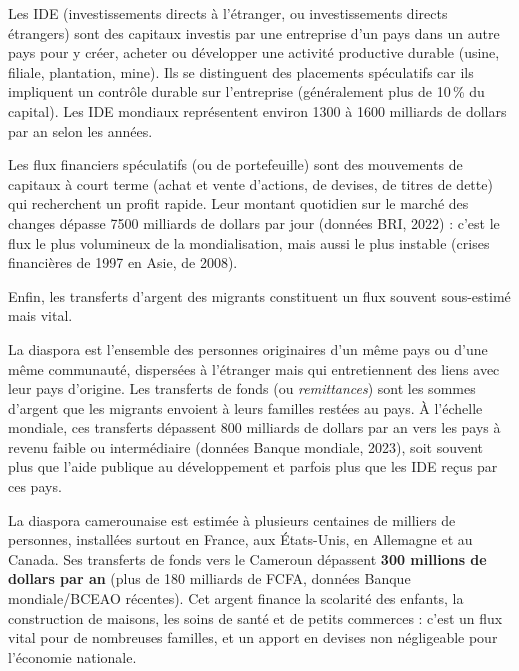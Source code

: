 \documentclass[11pt]{article}
\newcommand{\cle}[1]{{\popxbold\color{popdark}#1}}
\begin{document}
\begin{definition}
Les \cle{IDE} (investissements directs à l'étranger, ou investissements directs étrangers) sont des capitaux investis par une entreprise d'un pays dans un autre pays pour y créer, acheter ou développer une activité productive durable (usine, filiale, plantation, mine). Ils se distinguent des placements spéculatifs car ils impliquent un contrôle durable sur l'entreprise (généralement plus de 10\,\% du capital). Les IDE mondiaux représentent environ \num{1300} à \num{1600} milliards de dollars par an selon les années.
\end{definition}

Les \cle{flux financiers spéculatifs} (ou de portefeuille) sont des mouvements de capitaux à court terme (achat et vente d'actions, de devises, de titres de dette) qui recherchent un profit rapide. Leur montant quotidien sur le marché des changes dépasse \num{7500} milliards de dollars par jour (données BRI, 2022) : c'est le flux le plus volumineux de la mondialisation, mais aussi le plus instable (crises financières de 1997 en Asie, de 2008).

Enfin, les \cle{transferts d'argent des migrants} constituent un flux souvent sous-estimé mais vital.

\begin{definition}
La \cle{diaspora} est l'ensemble des personnes originaires d'un même pays ou d'une même communauté, dispersées à l'étranger mais qui entretiennent des liens avec leur pays d'origine. Les \cle{transferts de fonds} (ou \emph{remittances}) sont les sommes d'argent que les migrants envoient à leurs familles restées au pays. À l'échelle mondiale, ces transferts dépassent 800 milliards de dollars par an vers les pays à revenu faible ou intermédiaire (données Banque mondiale, 2023), soit souvent plus que l'aide publique au développement et parfois plus que les IDE reçus par ces pays.
\end{definition}

\begin{exemplebox}
La diaspora camerounaise est estimée à plusieurs centaines de milliers de personnes, installées surtout en France, aux États-Unis, en Allemagne et au Canada. Ses transferts de fonds vers le Cameroun dépassent \textbf{300 millions de dollars par an} (plus de 180 milliards de FCFA, données Banque mondiale/BCEAO récentes). Cet argent finance la scolarité des enfants, la construction de maisons, les soins de santé et de petits commerces : c'est un flux vital pour de nombreuses familles, et un apport en devises non négligeable pour l'économie nationale.
\end{exemplebox}
\end{document}
